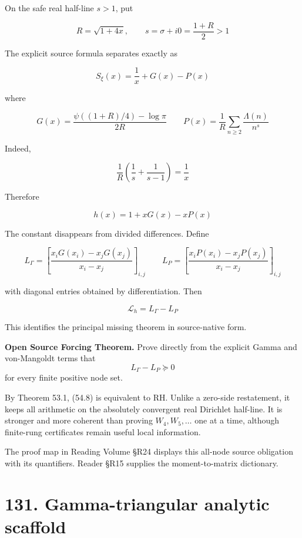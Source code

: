 \documentclass[
  11pt,
]{book}
\renewenvironment{quote}
  {\begin{tcolorbox}[
      enhanced,
      breakable,
      colback=tncream,
      colframe=tnrust,
      boxrule=0.8pt,
      arc=1.5pt,
      left=7pt,
      right=7pt,
      top=6pt,
      bottom=6pt]}
  {\end{tcolorbox}}
\begin{document}
On the safe real half-line \(s>1\), put

\[
R=\sqrt{1+4x},\qquad
s=\sigma+i0=\frac{1+R}{2}>1
\tag{54.1}
\]

The explicit source formula separates exactly as

\[
\boxed{
S_\xi(x)=\frac1x+G(x)-P(x)}
\tag{54.2}
\]

where

\[
G(x)=
\frac{\psi((1+R)/4)-\log\pi}{2R}
\qquad
P(x)=\frac1R\sum_{n\ge2}\frac{\Lambda(n)}{n^s}
\tag{54.3}
\]

Indeed,

\[
\frac1R\left(\frac1s+\frac1{s-1}\right)=\frac1x
\tag{54.4}
\]

Therefore

\[
h(x)=1+xG(x)-xP(x)
\tag{54.5}
\]

The constant disappears from divided differences. Define

\[
L_\Gamma=
\left[
\frac{x_iG(x_i)-x_jG(x_j)}{x_i-x_j}
\right]_{i,j}
\qquad
L_P=
\left[
\frac{x_iP(x_i)-x_jP(x_j)}{x_i-x_j}
\right]_{i,j}
\tag{54.6}
\]

with diagonal entries obtained by differentiation. Then

\[
\boxed{\mathcal L_h=L_\Gamma-L_P}
\tag{54.7}
\]

This identifies the principal missing theorem in source-native form.

\begin{quote}
\textbf{Open Source Forcing Theorem.} Prove directly from the explicit
Gamma and von-Mangoldt terms that \[
\boxed{L_\Gamma-L_P\succeq0}
\tag{54.8}
\] for every finite positive node set.
\end{quote}

By Theorem 53.1, (54.8) is equivalent to RH. Unlike a zero-side
restatement, it keeps all arithmetic on the absolutely convergent real
Dirichlet half-line. It is stronger and more coherent than proving
\(W_4,W_5,\ldots\) one at a time, although finite-rung certificates
remain useful local information.

The proof map in Reading Volume §R24 displays this all-node source
obligation with its quantifiers. Reader §R15 supplies the
moment-to-matrix dictionary.

\section{131. Gamma-triangular analytic
scaffold}\label{gamma-triangular-analytic-scaffold}
\end{document}

